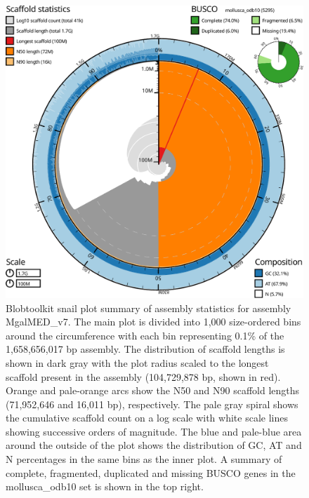 \documentclass[11pt, a4paper]{article}
\begin{document}
\begin{figure}
	\includegraphics[width=\linewidth]{figures/btk_snail_MgalMED_v7}
	\caption{Blobtoolkit snail plot summary of assembly statistics for assembly MgalMED\_v7. The main plot is divided into 1,000 size-ordered bins around the circumference with each bin representing 0.1\% of the 1,658,656,017 bp assembly. The distribution of scaffold lengths is shown in dark gray with the plot radius scaled to the longest scaffold present in the assembly (104,729,878 bp, shown in red). Orange and pale-orange arcs show the N50 and N90 scaffold lengths (71,952,646 and 16,011 bp), respectively. The pale gray spiral shows the cumulative scaffold count on a log scale with white scale lines showing successive orders of magnitude. The blue and pale-blue area around the outside of the plot shows the distribution of GC, AT and N percentages in the same bins as the inner plot. A summary of complete, fragmented, duplicated and missing BUSCO genes in the mollusca\_odb10 set is shown in the top right.}
	\label{supfig:btk-snail-MgalMED}
\end{figure}
\end{document}

